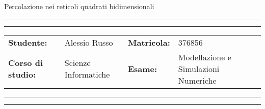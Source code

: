 \documentclass[11pt]{article}
\newcommand{\studentname}{Alessio Russo}
\newcommand{\studentnumber}{376856}
\newcommand{\course}{Scienze Informatiche}
\newcommand{\exam}{Modellazione e Simulazioni Numeriche}
\begin{document}
\begin{center}
{\Huge{Percolazione nei reticoli quadrati bidimensionali}} \\
\end{center}

\vspace{5mm}
\hrule
\vspace{1mm}
\hrule
\vspace{3mm}
\begin{center}
	\begin{tabular}{llll}
		\textbf{Studente: } & {\studentname}  & \textbf{Matricola:}  & {\studentnumber}  \\ 
		\textbf{Corso di studio: } & {\course}& \textbf{Esame:} & {\exam}\\ 
	\end{tabular}
\end{center}
\vspace{3mm}
\hrule
\vspace{1mm}
\hrule




\end{document}
